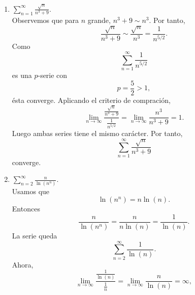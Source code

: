 \documentclass[12pt,a4paper]{article}
\begin{document}
    \begin{solucion}
        \begin{enumerate}
            \item[(a)] $\sum_{n=1}^{\infty}\frac{\sqrt{n}}{n^{3}+9}$.\\
            Observemos que para $n$ grande, $n^{3}+9\sim n^{3}$. Por tanto,
            \begin{equation*}
                \frac{\sqrt{n}}{n^{3}+9}\sim\frac{\sqrt{n}}{n^{3}}=\frac{1}{n^{5/2}}.
            \end{equation*}
            Como
            \begin{equation*}
                \sum_{n=1}^{\infty}\frac{1}{n^{5/2}}
            \end{equation*}
            es una $p$-serie con
            \begin{equation*}
                p=\frac{5}{2}\gt1,
            \end{equation*}
            ésta converge. Aplicando el criterio de compración,
            \begin{equation*}
                \lim_{n\to\infty}\frac{\frac{\sqrt{n}}{n^{3}+9}}{\frac{1}{n^{5/2}}}=\lim_{n\to\infty}\frac{n^{3}}{n^{3}+9}=1.
            \end{equation*}
            Luego ambas series tiene el mismo carácter. Por tanto,
            \begin{equation*}
                \sum_{n=1}^{\infty}\frac{\sqrt{n}}{n^{3}+9}
            \end{equation*}
            converge.
            \item[(b)] $\sum_{n=2}^{\infty}\frac{n}{\ln(n^{n})}$.\\
            Usamos que
            \begin{equation*}
                \ln(n^{n})=n\ln(n).
            \end{equation*}
            Entonces
            \begin{equation*}
                \frac{n}{\ln(n^{n})}=\frac{n}{n\ln(n)}=\frac{1}{\ln(n)}.
            \end{equation*}
            La serie queda
            \begin{equation*}
                \sum_{n=2}^{\infty}\frac{1}{\ln(n)}.
            \end{equation*}
            Ahora,
            \begin{equation*}
                \lim_{n\to\infty}\frac{\frac{1}{\ln(n)}}{\frac{1}{n}}=\lim_{n\to\infty}\frac{n}{\ln(n)}=\infty,

\end{equation*}
\end{enumerate}
\end{solucion}
\end{document}
